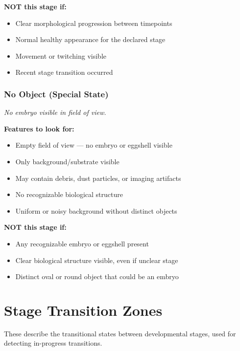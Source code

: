 \documentclass[11pt,letterpaper]{article}
\begin{document}
\textbf{NOT this stage if:}
\begin{itemize}
    \item Clear morphological progression between timepoints
    \item Normal healthy appearance for the declared stage
    \item Movement or twitching visible
    \item Recent stage transition occurred
\end{itemize}

\section{No Object (Special State)}
\textit{No embryo visible in field of view.}

\textbf{Features to look for:}
\begin{itemize}
    \item Empty field of view --- no embryo or eggshell visible
    \item Only background/substrate visible
    \item May contain debris, dust particles, or imaging artifacts
    \item No recognizable biological structure
    \item Uniform or noisy background without distinct objects
\end{itemize}

\textbf{NOT this stage if:}
\begin{itemize}
    \item Any recognizable embryo or eggshell present
    \item Clear biological structure visible, even if unclear stage
    \item Distinct oval or round object that could be an embryo
\end{itemize}

\newpage


\part*{Stage Transition Zones}

These describe the transitional states between developmental stages, used for detecting in-progress transitions.
\end{document}
